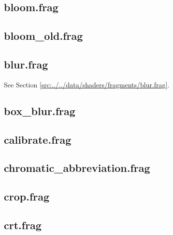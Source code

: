 \documentclass[../main/main.tex]{subfiles}
\begin{document}
\subsection{bloom.frag}

\label{src:data/shaders/fragments/bloom.frag}

\subsection{bloom\_old.frag}

\label{src:data/shaders/fragments/bloom_old.frag}

\subsection{blur.frag}
See Section \ref{src:../../data/shaders/fragments/blur.frag}.

\subsection{box\_blur.frag}

\label{src:data/shaders/fragments/box_blur.frag}

\subsection{calibrate.frag}

\label{src:data/shaders/fragments/calibrate.frag}

\subsection{chromatic\_abbreviation.frag}

\label{src:data/shaders/fragments/chromatic_abbreviation.frag}

\subsection{crop.frag}

\label{src:data/shaders/fragments/crop.frag}

\subsection{crt.frag}

\label{src:data/shaders/fragments/crt.frag}
\end{document}
